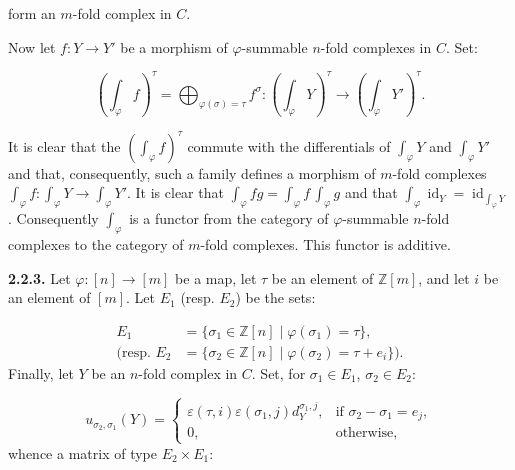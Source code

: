 %
%
form an $m$-fold complex in $C$.

Now let $f\colon Y\longrightarrow Y'$ be a morphism of
$\varphi$-summable $n$-fold complexes in $C$. Set:

\begin{equation}
  \left(\int_\varphi f\right)^\tau
  =\bigoplus_{\varphi(\sigma)=\tau}f^\sigma\colon
  \left(\int_\varphi Y\right)^\tau
  \longrightarrow
  \left(\int_\varphi Y'\right)^\tau.
  \tag{2.2.2.6}
\end{equation}

It is clear that the $\left(\int_\varphi f\right)^\tau$ commute with the
differentials of $\int_\varphi Y$ and $\int_\varphi Y'$ and that,
consequently, such a family defines a morphism of $m$-fold complexes
$\int_\varphi f\colon\int_\varphi Y\longrightarrow\int_\varphi Y'$.
It is clear that
$\int_\varphi fg=\int_\varphi f\,\int_\varphi g$ and that
$\int_\varphi\operatorname{id}_Y
=\operatorname{id}_{\int_\varphi Y}$. Consequently $\int_\varphi$ is a
functor from the category of $\varphi$-summable $n$-fold complexes to the
category of $m$-fold complexes. This functor is additive.

\noindent\textbf{2.2.3.}\quad
Let $\varphi\colon[n]\longrightarrow[m]$ be a map, let $\tau$ be an
element of $\mathbb Z[m]$, and let $i$ be an element of $[m]$. Let $E_1$
(resp. $E_2$) be the sets:

\[
  \begin{aligned}
    E_1&=\{\sigma_1\in\mathbb Z[n]\mid\varphi(\sigma_1)=\tau\},\\
    \text{(resp. }E_2
      &=\{\sigma_2\in\mathbb Z[n]\mid
          \varphi(\sigma_2)=\tau+e_i\}\text{)}.
  \end{aligned}
\]
Finally, let $Y$ be an $n$-fold complex in $C$. Set, for
$\sigma_1\in E_1$, $\sigma_2\in E_2$:

\begin{equation}
  u_{\sigma_2,\sigma_1}(Y)
  =\begin{cases}
    \varepsilon(\tau,i)\varepsilon(\sigma_1,j)d_Y^{\sigma_1,j},
      &\text{if }\sigma_2-\sigma_1=e_j,\\
    0,&\text{otherwise},
  \end{cases}
  \tag{2.2.3.1}
\end{equation}
whence a matrix of type $E_2\times E_1$:

